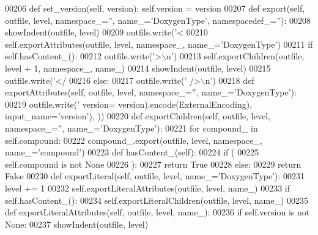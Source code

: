\begin{DoxyCode}
{{{{{{{{{{{{{{{{{{{{00206     \textcolor{keyword}{def }set_version(self, version): self.version = version
00207     \textcolor{keyword}{def }export(self, outfile, level, namespace\_='', name\_='DoxygenType', namespacedef\_=''):
00208         showIndent(outfile, level)
00209         outfile.write(\textcolor{stringliteral}{'<%
00210         self.exportAttributes(outfile, level, namespace\_, name\_=\textcolor{stringliteral}{'DoxygenType'})
00211         \textcolor{keywordflow}{if} self.hasContent_():
00212             outfile.write(\textcolor{stringliteral}{'>\(\backslash\)n'})
00213             self.exportChildren(outfile, level + 1, namespace\_, name\_)
00214             showIndent(outfile, level)
00215             outfile.write(\textcolor{stringliteral}{'</%
00216         \textcolor{keywordflow}{else}:
00217             outfile.write(\textcolor{stringliteral}{' />\(\backslash\)n'})
00218     \textcolor{keyword}{def }exportAttributes(self, outfile, level, namespace\_='', name\_='DoxygenType'):
00219         outfile.write(\textcolor{stringliteral}{' version=%
      version).encode(ExternalEncoding), input\_name=\textcolor{stringliteral}{'version'}), ))
00220     \textcolor{keyword}{def }exportChildren(self, outfile, level, namespace\_='', name\_='DoxygenType'):
00221         \textcolor{keywordflow}{for} compound\_ \textcolor{keywordflow}{in} self.compound:
00222             compound\_.export(outfile, level, namespace\_, name\_=\textcolor{stringliteral}{'compound'})
00223     \textcolor{keyword}{def }hasContent_(self):
00224         \textcolor{keywordflow}{if} (
00225             self.compound \textcolor{keywordflow}{is} \textcolor{keywordflow}{not} \textcolor{keywordtype}{None}
00226             ):
00227             \textcolor{keywordflow}{return} \textcolor{keyword}{True}
00228         \textcolor{keywordflow}{else}:
00229             \textcolor{keywordflow}{return} \textcolor{keyword}{False}
00230     \textcolor{keyword}{def }exportLiteral(self, outfile, level, name\_='DoxygenType'):
00231         level += 1
00232         self.exportLiteralAttributes(outfile, level, name\_)
00233         \textcolor{keywordflow}{if} self.hasContent_():
00234             self.exportLiteralChildren(outfile, level, name\_)
00235     \textcolor{keyword}{def }exportLiteralAttributes(self, outfile, level, name\_):
00236         \textcolor{keywordflow}{if} self.version \textcolor{keywordflow}{is} \textcolor{keywordflow}{not} \textcolor{keywordtype}{None}:
00237             showIndent(outfile, level)
}}}}}}}}}}}}}}}}}}}}}}}
\end{DoxyCode}
